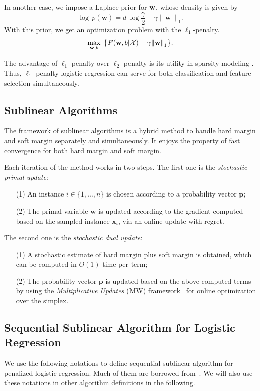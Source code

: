 \documentclass{llncs}
\newcommand{\bw}{\mathbf{w}}
\newcommand{\bp}{\mathbf{p}}
\newcommand{\lc}{\left(}
\newcommand{\rc}{\right)}
\def\w{{\bf w}}
\def\XM{{\mathcal X}}
\begin{document}
In another case, we impose a Laplace prior for $\w$, whose density is given by
\[	
\log\,p\lc\bw \rc=d\,\log\frac{\gamma}{2}-\gamma{\|\bw\|}_{1}.
\]
With this prior, we get an optimization problem with the $\ell_1$-penalty.
\begin{equation} \label{eqn:5}
	\max_{\bw ,b} \;  \big\{F(\w, b|\XM)- \gamma{\|\bw \|}_{1}\big\}.	
\end{equation}

The advantage of $\ell_1$-penalty over $\ell_2$-penalty is its utility in sparsity modeling \cite{tibshirani1996regression}.
Thus, $\ell_1$-penalty logistic regression can serve for both classification and feature selection simultaneously.

\subsection{Sublinear Algorithms}
The framework of sublinear algorithms is a hybrid method to handle hard margin and soft margin separately and simultaneously.
It enjoys the property of fast convergence for both hard margin and soft margin.

Each iteration of the method works in two steps.
The first one is the \textit{stochastic primal update}:
\begin{enumerate}
\item[{(1)}] \; An instance $i\in \{1,\ldots, n\}$ is chosen according to a probability vector $\bp$;
\item[{(2)}] \; The primal variable $\bw$ is updated according to the gradient computed based on the sampled instance $\textbf{x}_i$, via an online update with regret.
\end{enumerate}

The second one is the \textit{stochastic dual update}:
\begin{enumerate}
\item[{(1)}] \; A stochastic estimate of hard margin plus soft margin is obtained, which can be computed in $O(1)$ time per term;
\item[{(2)}] \; The probability vector $\bp$ is updated based on the above computed terms by using the \textit{Multiplicative Updates} (MW) framework~\cite{arora2005multiplicative} for online optimization over the simplex.
\end{enumerate}

\subsection{Sequential Sublinear Algorithm for Logistic Regression} \label{sec:l2alg}
We use the following notations to define sequential sublinear algorithm for penalized logistic regression.
Much of them are borrowed from~\cite{peng2012sublinear}.
We will also use these notations in other algorithm definitions in the following.  
\end{document}

